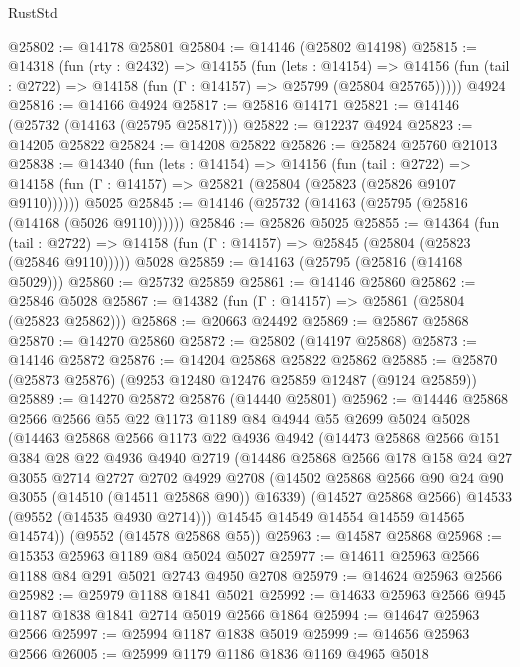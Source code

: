 \begin{lexlean}{RustStd}
\begin{coremodule}
@25802 := @14178 @25801
@25804 := @14146 (@25802 @14198)
@25815 := @14318
    (fun (rty : @2432) =>
    @14155
      (fun (lets : @14154) =>
      @14156 (fun (tail : @2722) => @14158 (fun (Γ : @14157) => @25799 (@25804 @25765)))))
    @4924
@25816 := @14166 @4924
@25817 := @25816 @14171
@25821 := @14146 (@25732 (@14163 (@25795 @25817)))
@25822 := @12237 @4924
@25823 := @14205 @25822
@25824 := @14208 @25822
@25826 := @25824 @25760 @21013
@25838 := @14340
    (fun (lets : @14154) =>
    @14156
      (fun (tail : @2722) =>
      @14158 (fun (Γ : @14157) => @25821 (@25804 (@25823 (@25826 @9107 @9110))))))
    @5025
@25845 := @14146 (@25732 (@14163 (@25795 (@25816 (@14168 (@5026 @9110))))))
@25846 := @25826 @5025
@25855 := @14364
    (fun (tail : @2722) => @14158 (fun (Γ : @14157) => @25845 (@25804 (@25823 (@25846 @9110)))))
    @5028
@25859 := @14163 (@25795 (@25816 (@14168 @5029)))
@25860 := @25732 @25859
@25861 := @14146 @25860
@25862 := @25846 @5028
@25867 := @14382 (fun (Γ : @14157) => @25861 (@25804 (@25823 @25862)))
@25868 := @20663 @24492
@25869 := @25867 @25868
@25870 := @14270 @25860
@25872 := @25802 (@14197 @25868)
@25873 := @14146 @25872
@25876 := @14204 @25868 @25822 @25862
@25885 := @25870 (@25873 @25876) (@9253 @12480 @12476 @25859 @12487 (@9124 @25859))
@25889 := @14270 @25872 @25876 (@14440 @25801)
@25962 := @14446
    @25868
    @2566
    @2566
    @55
    @22
    @1173
    @1189
    @84
    @4944
    @55
    @2699
    @5024
    @5028
    (@14463
      @25868
      @2566
      @1173
      @22
      @4936
      @4942
      (@14473
        @25868
        @2566
        @151
        @384
        @28
        @22
        @4936
        @4940
        @2719
        (@14486
          @25868
          @2566
          @178
          @158
          @24
          @27
          @3055
          @2714
          @2727
          @2702
          @4929
          @2708
          (@14502 @25868 @2566 @90 @24 @90 @3055 (@14510 (@14511 @25868 @90)) @16339)
          (@14527 @25868 @2566)
          @14533
          (@9552 (@14535 @4930 @2714)))
        @14545
        @14549
        @14554
        @14559
        @14565
        @14574))
    (@9552 (@14578 @25868 @55))
@25963 := @14587 @25868
@25968 := @15353 @25963 @1189 @84 @5024 @5027
@25977 := @14611 @25963 @2566 @1188 @84 @291 @5021 @2743 @4950 @2708
@25979 := @14624 @25963 @2566
@25982 := @25979 @1188 @1841 @5021
@25992 := @14633 @25963 @2566 @945 @1187 @1838 @1841 @2714 @5019 @2566 @1864
@25994 := @14647 @25963 @2566
@25997 := @25994 @1187 @1838 @5019
@25999 := @14656 @25963 @2566
@26005 := @25999 @1179 @1186 @1836 @1169 @4965 @5018

\end{coremodule}
\end{lexlean}
